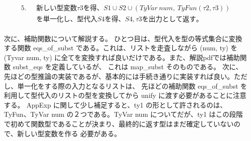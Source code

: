 \documentclass{jreport}
\begin{document}
\begin{equation}
  \begin{split}
    5. \ \ \ &新しい型変数 \tau3 を得、S1 \cup S2 \cup (TyVar \ num, \ TyFun(\tau2, \tau3)) \\ &を単一化し、
    型代入S4を得、S4,\tau3 を出力として返す。
  \end{split}
\end{equation}
\\
次に、補助関数について解説する。
ひとつ目は、型代入を型の等式集合に変換する関数 eqs\_of\_subst である。これは、リストを走査しながら
(num, ty) を (Tyvar num, ty) に全てを変換すれば良いだけである。また、解説pdfでは補助関数 subst\_eqs を定義しているが、
これは map\_subst そのものである。
次に、先ほどの型推論の実装であるが、基本的には手続き通りに実装すれば良い。ただし、単一化をする際の入力となるリストは、
先ほどの補助関数 eqs\_of\_subst を利用して型代入のリストの型を変換してから unify に渡す必要があることに注意する。
AppExp に関して少し補足すると、ty1 の形として許されるのは、TyFun、TyVar num の２つである。TyVar num についてだが、ty1 はこの段階で初めて関数型であることが決まり、最終的に返す型はまだ確定していないので、新しい型変数を作る
必要がある。
\end{document}
